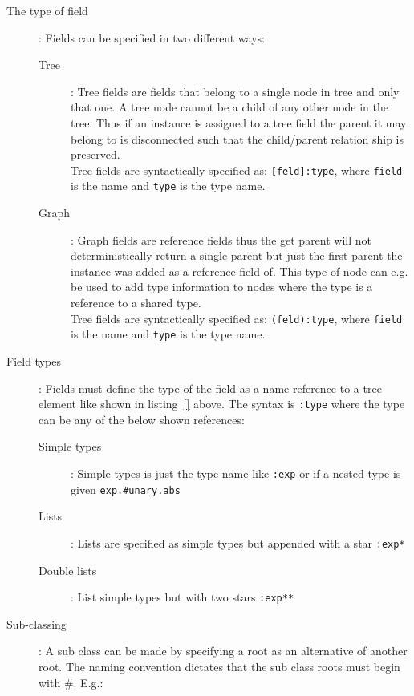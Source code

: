 \begin{description}
\begin{description}
\item [The type of field]:
Fields can be specified in two different ways:
\begin{description}
\item[Tree]: Tree fields are fields that belong to a single node in tree and only that one. A tree node cannot be a child of any other node in the tree. Thus if an instance is assigned to a tree field the parent it may belong to is disconnected such that the child/parent relation ship is preserved.\\
Tree fields are syntactically specified as: \texttt{[feld]:type}, where \texttt{field} is the name and \texttt{type} is the type name.
\item[Graph]: Graph fields are reference fields thus the get parent will not deterministically return a single parent but just the first parent the instance was added as a reference field of. This type of node can e.g. be used to add type information to nodes where the type is a reference to a shared type. \\
Tree fields are syntactically specified as: \texttt{(feld):type}, where \texttt{field} is the name and \texttt{type} is the type name.
\end{description}

\item [Field types]:
Fields must define the type of the field as a name reference to a tree element like shown in listing~\ref{} above. The syntax is \texttt{:type} where the type can be any of the below shown references:
\begin{description}
\item[Simple types]: Simple types is just the type name like \texttt{:exp} or if a nested type is given \texttt{exp.\#unary.abs}
\item[Lists]: Lists are specified as simple types but appended with a star \texttt{:exp*}
\item[Double lists]: List simple types but with two stars \texttt{:exp**}
\end{description}

\item [Sub-classing]: A sub class can be made by specifying a root as an alternative of another root. The naming convention dictates that the sub class roots must begin with \#. E.g.:

\begin{figure}[htb]
\begin{minipage}{0.5\linewidth}


\end{minipage}
\end{figure}
\end{description}
\end{description}
